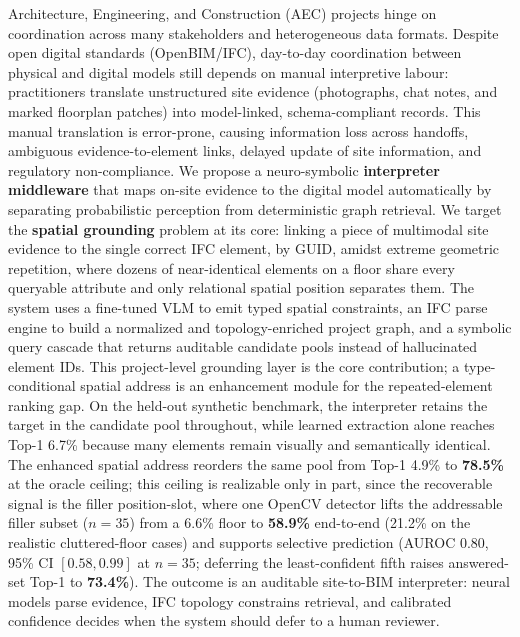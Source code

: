 Architecture, Engineering, and Construction (AEC) projects hinge on coordination across many
stakeholders and heterogeneous data formats. Despite open digital standards (OpenBIM/IFC), day-to-day
coordination between physical and digital models still depends on manual interpretive labour: practitioners translate unstructured site
evidence (photographs, chat notes, and marked floorplan patches) into model-linked,
schema-compliant records. This manual translation is error-prone, causing information loss across
handoffs, ambiguous evidence-to-element links, delayed update of site information, and regulatory non-compliance. We propose a
neuro-symbolic \textbf{interpreter middleware} that maps on-site evidence to the digital model
automatically by separating probabilistic perception from deterministic graph retrieval. We target
the \textbf{spatial grounding} problem at its core: linking a piece of multimodal site evidence to
the single correct IFC element, by GUID, amidst extreme geometric repetition, where dozens of
near-identical elements on a floor share every queryable attribute and only relational spatial position
separates them. The system uses a fine-tuned VLM to emit typed spatial constraints, an IFC parse
engine to build a normalized and topology-enriched project graph, and a symbolic query cascade that
returns auditable candidate pools instead of hallucinated element IDs. This project-level grounding
layer is the core contribution; a type-conditional spatial address is an enhancement module for the
repeated-element ranking gap. On the held-out synthetic benchmark, the interpreter retains the target
in the candidate pool throughout, while learned extraction alone reaches Top-1 6.7\% because many
elements remain visually and semantically identical. The enhanced spatial address reorders the same pool from Top-1
4.9\% to \textbf{78.5\%} at the oracle ceiling; this ceiling is realizable only in part, since the
recoverable signal is the filler position-slot, where one OpenCV detector lifts the addressable
filler subset ($n=35$) from a 6.6\% floor to \textbf{58.9\%} end-to-end (21.2\% on the realistic
cluttered-floor cases) and supports selective prediction (AUROC 0.80, 95\% CI $[0.58, 0.99]$ at
$n=35$; deferring the least-confident fifth raises answered-set Top-1 to \textbf{73.4\%}). The outcome is an auditable site-to-BIM
interpreter: neural models parse evidence, IFC topology constrains retrieval, and calibrated
confidence decides when the system should defer to a human reviewer.
